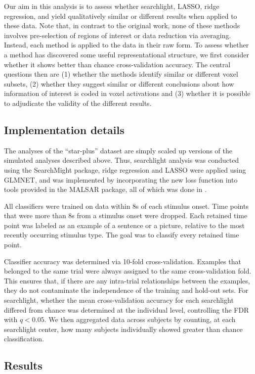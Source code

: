 Our aim in this analysis is to assess whether searchlight, LASSO, ridge regression, and \soslasso yield qualitatively similar or different results when applied to these data. Note that, in contrast to the original work, none of these methods involves pre-selection of regions of interest or data reduction via averaging. Instead, each method is applied to the data in their raw form. To assess whether a method has discovered some useful representational structure, we first consider whether it shows better than chance cross-validation accuracy. The central questions then are (1) whether the methods identify similar or different voxel subsets, (2) whether they suggest similar or different conclusions about how information of interest is coded in voxel activations and (3) whether it is possible to adjudicate the validity of the different results.

\subsection{Implementation details}
The analyses of the ``star-plus'' dataset are simply scaled up versions of the simulated analyses described above. Thus, searchlight analysis was conducted using the SearchMight package, ridge regression and LASSO were applied using GLMNET, and \soslasso was implemented by incorporating the new loss function into tools provided in the MALSAR package, all of which was done in \matlab. 

All classifiers were trained on data within 8s of each stimulus onset. Time points that were more than 8s from a stimulus onset were dropped. Each retained time point was labeled as an example of a sentence or a picture, relative to the most recently occurring stimulus type. The goal was to classify every retained time point.

Classifier accuracy was determined via 10-fold cross-validation. Examples that belonged to the same trial were always assigned to the same cross-validation fold. This ensures that, if there are any intra-trial relationships between the examples, they do not contaminate the independence of the training and hold-out sets. For searchlight, whether the mean cross-validation accuracy for each searchlight differed from chance was determined at the individual level, controlling the FDR with $q < 0.05$. We then aggregated data across subjects by counting, at each searchlight center, how many subjects individually showed greater than chance classification. 

\subsection{Results}

